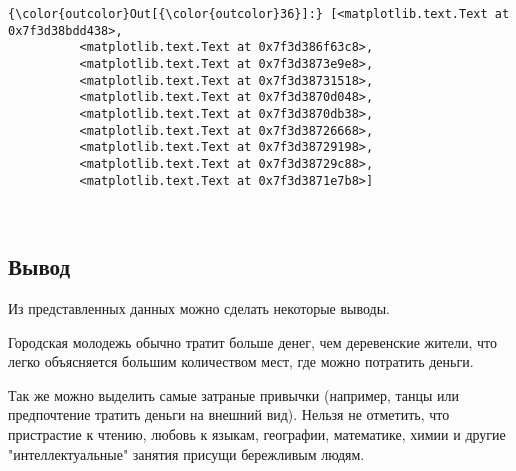 \documentclass[11pt]{article}
\begin{document}
\begin{Verbatim}[commandchars=\\\{\}]
{\color{outcolor}Out[{\color{outcolor}36}]:} [<matplotlib.text.Text at 0x7f3d38bdd438>,
          <matplotlib.text.Text at 0x7f3d386f63c8>,
          <matplotlib.text.Text at 0x7f3d3873e9e8>,
          <matplotlib.text.Text at 0x7f3d38731518>,
          <matplotlib.text.Text at 0x7f3d3870d048>,
          <matplotlib.text.Text at 0x7f3d3870db38>,
          <matplotlib.text.Text at 0x7f3d38726668>,
          <matplotlib.text.Text at 0x7f3d38729198>,
          <matplotlib.text.Text at 0x7f3d38729c88>,
          <matplotlib.text.Text at 0x7f3d3871e7b8>]
\end{Verbatim}
            
    \begin{center}
    \end{center}
    { \hspace*{\fill} \\}
 
\subsection{Вывод}

Из представленных данных можно сделать некоторые выводы. 

Городская молодежь обычно тратит больше денег, чем деревенские жители, что легко 
объясняется большим количеством мест, где можно потратить деньги. 

Так же можно выделить самые затраные привычки (например, танцы или предпочтение тратить 
деньги на внешний вид).
Нельзя не отметить, что пристрастие к  чтению, любовь к языкам, географии, математике, химии и другие "интеллектуальные" занятия присущи бережливым людям.
    
    
    
\end{document}
